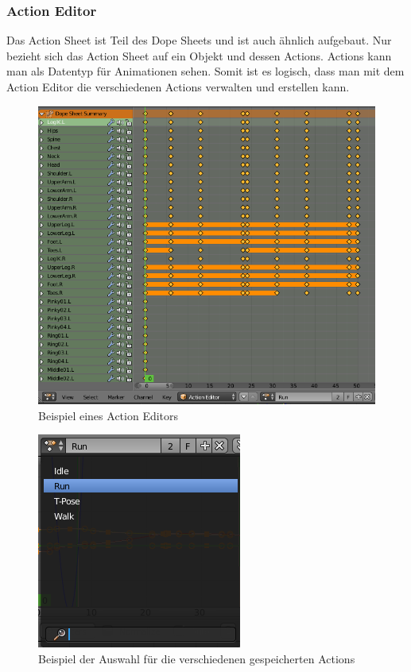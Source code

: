 \subsubsection{Action Editor}
Das Action Sheet ist Teil des Dope Sheets und ist auch ähnlich aufgebaut. Nur bezieht sich das Action Sheet auf ein Objekt und dessen Actions.
Actions kann man als Datentyp für Animationen sehen. Somit ist es logisch, dass man mit dem Action Editor die verschiedenen Actions verwalten und erstellen kann.

\begin{figure}[H]
                \centering

                \includegraphics[width=.8\textwidth]{images/animation_action_editor.PNG}
                \caption{Beispiel eines Action Editors}
\end{figure}

\begin{figure}[H]
    \centering

    \includegraphics[width=.8\textwidth]{images/animation_action_editor_actions.PNG}
    \caption{Beispiel der Auswahl für die verschiedenen gespeicherten Actions}
\end{figure}

